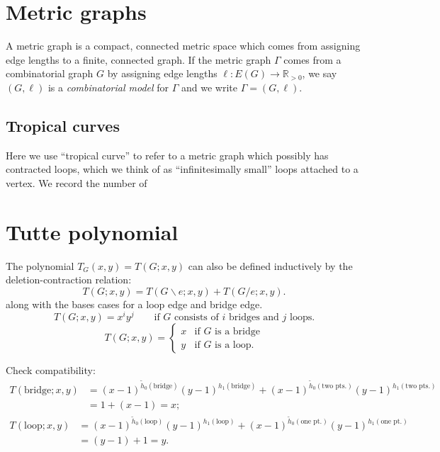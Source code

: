 \documentclass{amsart}
\theoremstyle{definition}
\newcommand{\RR}{\mathbb{R}}
\begin{document}
\section{Metric graphs}
A metric graph is a compact, connected metric space which comes from 
assigning edge lengths to a finite, connected graph.
If the metric graph $\Gamma$
comes from a combinatorial graph $G$ by 
assigning edge lengths $\ell : E(G) \to \RR_{>0}$,
we say $(G,\ell)$ is a {\em combinatorial model} for $\Gamma$
and we write $\Gamma = (G,\ell)$.


\subsection{Tropical curves}

Here we use ``tropical curve'' 
to refer to a metric graph which possibly has contracted loops,
which we think of as ``infinitesimally small'' loops attached to a vertex.
We record the number of 

\section{Tutte polynomial}
The polynomial $T_G(x,y) = T(G; x,y)$ can also be defined inductively by the 
deletion-contraction relation:
\begin{equation*}
T(G;x,y) = T(G \backslash e; x,y) + T(G / e; x,y).
\end{equation*}
along with the bases cases for a loop edge and bridge edge.
\begin{equation*}
T(G; x,y) = x^i y^j \qquad\text{if $G$ consists of $i$ bridges and $j$ loops.}
\end{equation*}
\begin{equation*}
T(G;x,y) = \begin{cases}
x & \text{if $G$ is a bridge} \\
y & \text{if $G$ is a loop}.
\end{cases}
\end{equation*}

Check compatibility:
\begin{align*}
T(\text{bridge}; x,y) 
&= (x-1)^{\tilde h_0(\text{bridge}) }(y-1)^{h_1(\text{bridge} )} 
+ (x-1)^{\tilde h_0(\text{two pts.}) }(y-1)^{h_1(\text{two pts.})}  \\
&= 1 + (x-1) = x ;
\end{align*}
\begin{align*}
T(\text{loop}; x,y) 
&= (x-1)^{\tilde h_0(\text{loop}) }(y-1)^{h_1(\text{loop} )} 
+ (x-1)^{\tilde h_0(\text{one pt.}) }(y-1)^{h_1(\text{one pt.})} \\
&= (y-1) + 1 = y .
\end{align*}
\end{document}
